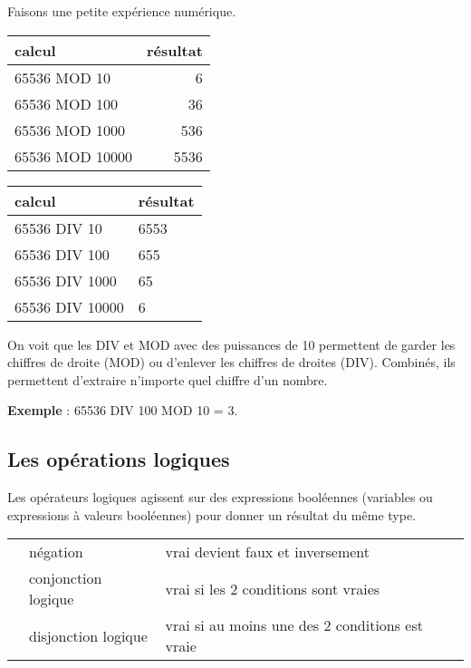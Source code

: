 				Faisons une petite expérience numérique.
				\begin{center}
				\begin{tabular}{|l|r|}\hline
					calcul & résultat \\\hline
					\hline
					65536 MOD 10 & 6 \\  
					65536 MOD 100 & 36 \\  
					65536 MOD 1000 & 536 \\  
					65536 MOD 10000 & 5536 \\ 
					\hline 
				\end{tabular}
				\qquad
				\begin{tabular}{|l|l|}\hline
					calcul & résultat \\\hline
					\hline
					65536 DIV 10 & 6553 \\  
					65536 DIV 100 & 655 \\  
					65536 DIV 1000 & 65 \\  
					65536 DIV 10000 & 6 \\ 
					\hline 
				\end{tabular}
				\end{center}
			
				On voit que les DIV et MOD avec des puissances de 10
				permettent de garder les chiffres de droite (MOD)
				ou d'enlever les chiffres de droites (DIV).
				Combinés, ils permettent d'extraire n'importe quel
				chiffre d'un nombre.
				
				\textbf{Exemple} : 65536 DIV 100 MOD 10 = 3.
				
		\subsection{Les opérations logiques}
	
			Les opérateurs logiques agissent sur des expressions booléennes 
			(variables ou expressions à valeurs booléennes) 
			pour donner un résultat du même type.
	
			\begin{center}
			\begin{tabular}{m{1cm}|m{3cm}|m{8cm}}
			\raggedleft \lda{NON} & négation & vrai devient faux et inversement\\
			\raggedleft \lda{ET} & conjonction logique & vrai si les 2 conditions sont vraies\\
			\raggedleft \lda{OU} & disjonction logique & vrai si au moins une des 2 conditions est vraie\\
			\end{tabular}
			\end{center}
			
